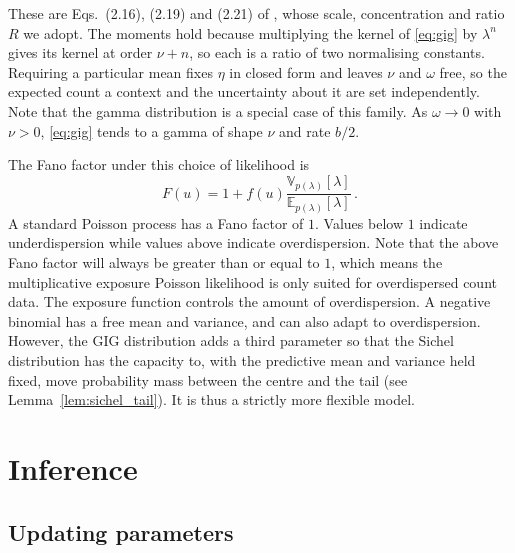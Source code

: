 \documentclass[twoside]{article}
\providecommand{\Ex}[2]{\mathbb{E}_{#1}\!\left[#2\right]}
\providecommand{\Var}[2]{\mathbb{V}_{#1}\!\left[#2\right]}
\theoremstyle{plain}
\theoremstyle{definition}
\theoremstyle{remark}
\begin{document}
These are Eqs.~(2.16), (2.19) and (2.21) of \citet{jorgensen1982statistical}, whose scale, concentration and ratio $R$ we adopt.
The moments hold because multiplying the kernel of \eqref{eq:gig} by $\lambda^{n}$ gives its kernel at order $\nu + n$, so each is a ratio of two normalising constants.
Requiring a particular mean fixes $\eta$ in closed form and leaves $\nu$ and $\omega$ free, so the expected count a context and the uncertainty about it are set independently.
Note that the gamma distribution is a special case of this family. As $\omega \to 0$ with $\nu > 0$, \eqref{eq:gig} tends to a gamma of shape $\nu$ and rate $b/2$.

The Fano factor under this choice of likelihood is
\begin{equation}
    F(u) = 1 + f(u) \frac{\Var{p(\lambda)}{\lambda}}{\Ex{p(\lambda)}{\lambda}} \, .
    \label{eq:fano}
\end{equation}
A standard Poisson process has a Fano factor of $1$. Values below $1$ indicate underdispersion while values above indicate overdispersion. Note that the above Fano factor will always be greater than or equal to $1$, which means the multiplicative exposure Poisson likelihood is only suited for overdispersed count data. The exposure function controls the amount of overdispersion. 
A negative binomial has a free mean and variance, and can also adapt to overdispersion. However, the GIG distribution adds a third parameter so that the Sichel distribution has the capacity to, with the predictive mean and variance held fixed, move probability mass between the centre and the tail (see Lemma~\ref{lem:sichel_tail}). It is thus a strictly more flexible model.

\section{Inference}
\label{sec:inference}


\subsection{Updating parameters}
\label{sec:inference_update}
\end{document}
